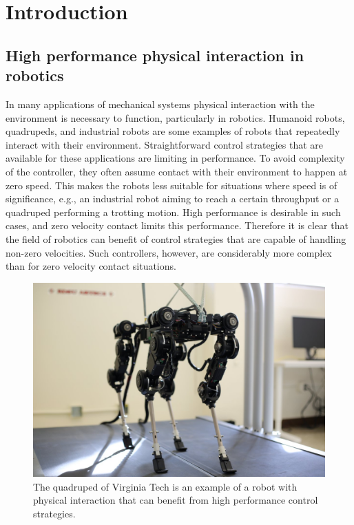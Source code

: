 \documentclass[../DC2017114Bouma.tex]{subfiles}
\begin{document}
\graphicspath{{01_Introduction/img/}}
\renewcommand{\chaptermark}[1]{\markboth{\thechapter.\ #1}{}}
\renewcommand{\sectionmark}[1]{\markright{#1}{}}
\cleartooddpage
\pagestyle{fancyreport}

\chapter{Introduction}
\section{High performance physical interaction in robotics}
In many applications of mechanical systems physical interaction with the environment is necessary to function, particularly in robotics. Humanoid robots, quadrupeds, and industrial robots are some examples of robots that repeatedly interact with their environment. Straightforward control strategies that are available for these applications are limiting in performance. To avoid complexity of the controller, they often assume contact with their environment to happen at zero speed. This makes the robots less suitable for situations where speed is of significance, e.g., an industrial robot aiming to reach a certain throughput or a quadruped performing a trotting motion. High performance is desirable in such cases, and zero velocity contact limits this performance. Therefore it is clear that the field of robotics can benefit of control strategies that are capable of handling non-zero velocities. Such controllers, however, are considerably more complex than for zero velocity contact situations.

\begin{figure}[H]
\centering
\includegraphics[width=.5\textwidth]{quadruped.jpg}\caption{The quadruped of Virginia Tech is an example of a robot with physical interaction that can benefit from high performance control strategies.}\label{fig:quadrupedVT}
\end{figure}
\end{document}
